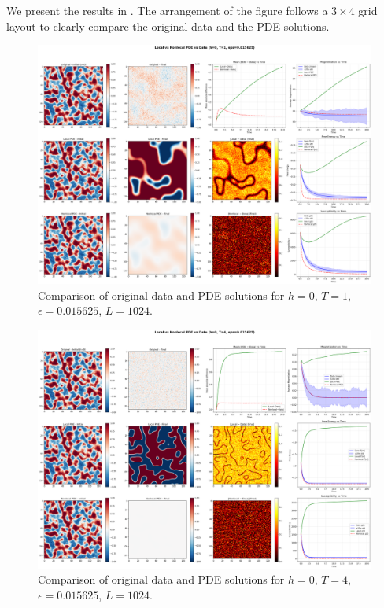 \documentclass[11pt,a4paper]{article}
\begin{document}
We present the results in . The arrangement of the figure follows a $3 \times 4$ grid layout to clearly compare the original data and the PDE solutions.  



\begin{figure}[!h]
    \centering
    \includegraphics[width=1.0\textwidth]{fig/compare_local_nonlocal_L1024_h0_T1_eps0.015625.png}
    \caption{Comparison of original data and PDE solutions for $h=0$, $T=1$, $\epsilon=0.015625$, $L=1024$.}
    \label{fig:pde_comparison_h0_T1_eps0.015625}
\end{figure}


\begin{figure}[!h]
    \centering
    \includegraphics[width=1.0\textwidth]{fig/compare_local_nonlocal_L1024_h0_T4_eps0.015625.png}
    \caption{Comparison of original data and PDE solutions for $h=0$, $T=4$, $\epsilon=0.015625$, $L=1024$.}
    \label{fig:pde_comparison_h0_T4_eps0.015625}
\end{figure}
\end{document}
